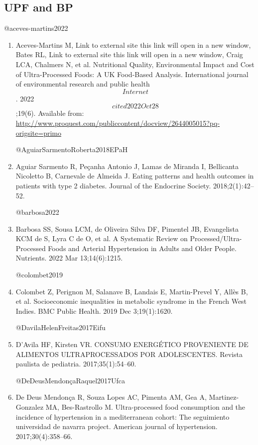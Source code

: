 \documentclass[
]{article}
\begin{document}
\hypertarget{upf-and-bp-1}{%
\subsection{UPF and BP}\label{upf-and-bp-1}}

@aceves-martins2022

\begin{enumerate}
\def\labelenumi{\arabic{enumi}.}
\item
  Aceves-Martins M, Link to external site this link will open in a new
  window, Bates RL, Link to external site this link will open in a new
  window, Craig LCA, Chalmers N, et al. Nutritional Quality,
  Environmental Impact and Cost of Ultra-Processed Foods: A UK
  Food-Based Analysis. International journal of environmental research
  and public health \[Internet\]. 2022 \[cited 2022 Oct 28\];19(6).
  Available from:
  \url{http://www.proquest.com/publiccontent/docview/2644005015?pq-origsite=primo}

  @AguiarSarmentoRoberta2018EPaH
\item
  Aguiar Sarmento R, Peçanha Antonio J, Lamas de Miranda I, Bellicanta
  Nicoletto B, Carnevale de Almeida J. Eating patterns and health
  outcomes in patients with type 2 diabetes. Journal of the Endocrine
  Society. 2018;2(1):42--52.

  @barbosa2022
\item
  Barbosa SS, Sousa LCM, de Oliveira Silva DF, Pimentel JB, Evangelista
  KCM de S, Lyra C de O, et al. A Systematic Review on
  Processed/Ultra-Processed Foods and Arterial Hypertension in Adults
  and Older People. Nutrients. 2022 Mar 13;14(6):1215.

  @colombet2019
\item
  Colombet Z, Perignon M, Salanave B, Landais E, Martin-Prevel Y, Allès
  B, et al. Socioeconomic inequalities in metabolic syndrome in the
  French West Indies. BMC Public Health. 2019 Dec 3;19(1):1620.

  @DavilaHelenFreitas2017Eifu
\item
  D'Avila HF, Kirsten VR. CONSUMO ENERGÉTICO PROVENIENTE DE ALIMENTOS
  ULTRAPROCESSADOS POR ADOLESCENTES. Revista paulista de pediatria.
  2017;35(1):54--60.

  @DeDeusMendonçaRaquel2017Ufca
\item
  De Deus Mendonça R, Souza Lopes AC, Pimenta AM, Gea A,
  Martinez-Gonzalez MA, Bes-Rastrollo M. Ultra-processed food
  consumption and the incidence of hypertension in a mediterranean
  cohort: The seguimiento universidad de navarra project. American
  journal of hypertension. 2017;30(4):358--66.


\end{enumerate}
\end{document}
